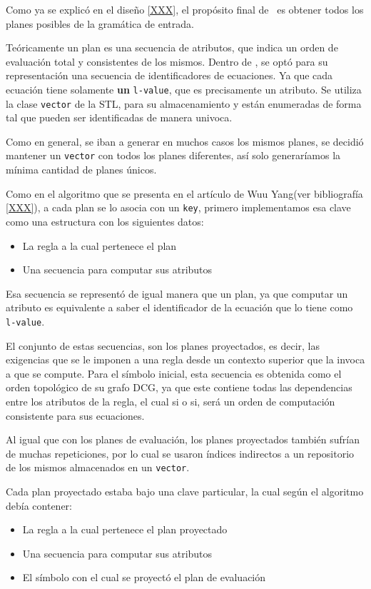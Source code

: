 Como ya se explicó en el diseño \ref{XXX}, el propósito final de \maggen\ es obtener todos los planes posibles de la gramática de entrada.

Teóricamente un plan es una secuencia de atributos, que indica un orden de evaluación total y consistentes de los mismos. Dentro de \maggen, se optó para su representación una secuencia de identificadores de ecuaciones. Ya que cada ecuación tiene solamente \textbf{un} \texttt{l-value}, que es precisamente un atributo. Se utiliza la clase \texttt{vector} de la STL, para su almacenamiento y están enumeradas de forma tal que pueden ser identificadas de manera univoca.

Como en general, se iban a generar en muchos casos los mismos planes, se decidió mantener un \texttt{vector} con todos los planes diferentes, así solo generaríamos la mínima cantidad de planes únicos.

Como en el algoritmo que se presenta en el artículo de Wuu Yang(ver bibliografía \ref{XXX}), a cada plan se lo asocia con un \texttt{key}, primero implementamos esa clave como una estructura con los siguientes datos:
\begin{itemize}
\item La regla a la cual pertenece el plan
\item Una secuencia para computar sus atributos
\end{itemize}

Esa secuencia se representó de igual manera que un plan, ya que computar un atributo es equivalente a saber el identificador de la ecuación que lo tiene como \texttt{l-value}.

El conjunto de estas secuencias, son los planes proyectados, es decir, las exigencias que se le imponen a una regla desde un contexto superior que la invoca a que se compute. Para el símbolo inicial, esta secuencia es obtenida como el orden topológico de su grafo DCG, ya que este contiene todas las dependencias entre los atributos de la regla, el cual si o si, será un orden de computación consistente para sus ecuaciones.

Al igual que con los planes de evaluación, los planes proyectados también sufrían de muchas repeticiones, por lo cual se usaron índices indirectos a un repositorio de los mismos almacenados en un \texttt{vector}.

Cada plan proyectado estaba bajo una clave particular, la cual según el algoritmo debía contener:
\begin{itemize}
\item La regla a la cual pertenece el plan proyectado
\item Una secuencia para computar sus atributos
\item El símbolo con el cual se proyectó el plan de evaluación
\end{itemize}

